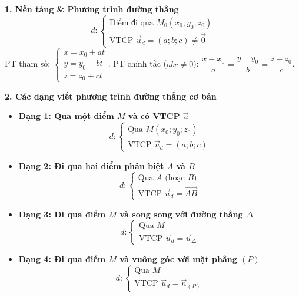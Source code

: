 \documentclass[12pt,a4paper]{article}
\begin{document}
\begin{theorybox}
    \textbf{\textcolor{deepblue}{\large 1. Nền tảng \& Phương trình đường thẳng}}
    \[
        d\colon \begin{cases} 
            \text{Điểm đi qua } M_0(x_0; y_0; z_0) \\ 
            \text{VTCP } \vec{u}_d = (a; b; c) \neq \vec{0}
        \end{cases}
    \]
    PT tham số: $\begin{cases} x = x_0 + at \\ y = y_0 + bt \\ z = z_0 + ct \end{cases}$. \qquad PT chính tắc ($abc \neq 0$): $\dfrac{x - x_0}{a} = \dfrac{y - y_0}{b} = \dfrac{z - z_0}{c}$.

    \vspace{0.2cm}
    \textbf{\textcolor{amberorange}{\large 2. Các dạng viết phương trình đường thẳng cơ bản}}
    \begin{itemize}\setlength{\itemsep}{8pt}
        \item \textbf{Dạng 1: Qua một điểm $M$ và có VTCP $\vec{u}$}
        \[
            d\colon \begin{cases} \text{Qua } M(x_0; y_0; z_0) \\ \text{VTCP } \vec{u}_d = (a; b; c) \end{cases}
        \]

        \item \textbf{Dạng 2: Đi qua hai điểm phân biệt $A$ và $B$}
        \[
            d\colon \begin{cases} \text{Qua } A \text{ (hoặc } B\text{)} \\ \text{VTCP } \vec{u}_d = \vec{AB} \end{cases}
        \]

        \item \textbf{Dạng 3: Đi qua điểm $M$ và song song với đường thẳng $\Delta$}
        \[
            d\colon \begin{cases} \text{Qua } M \\ \text{VTCP } \vec{u}_d = \vec{u}_\Delta \end{cases}
        \]

        \item \textbf{Dạng 4: Đi qua điểm $M$ và vuông góc với mặt phẳng $(P)$}
        \[
            d\colon \begin{cases} \text{Qua } M \\ \text{VTCP } \vec{u}_d = \vec{n}_{(P)} \end{cases}
        \]


\end{itemize}
\end{theorybox}
\end{document}
